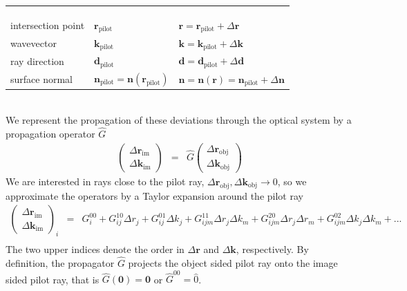 \documentclass[12pt,a4paper,twoside,openright,BCOR10mm,headsepline,titlepage,abstracton,chapterprefix,final]{scrreprt}
\newcommand\Vector[1]{{\mathbf{#1}}}
\newcommand\wavenumber{k}
\newcommand\Wavevector{\Vector{\wavenumber}}
\newcommand\pilot{\textrm{pilot}}
\newcommand\im{\textrm{im}}
\newcommand\obj{\textrm{obj}}
\begin{document}
\begin{tabular}{ l | l | l }
		    & \text{pilot ray} & \text{near-pilot ray} \\
& & \\ \hline & & \\
intersection point  & $\Vector{r}_{\pilot}$ & ${\Vector{r}} = \Vector{r}_{\pilot} + \Delta\Vector{r}$ \\
wavevector  & $\Wavevector_{\pilot}$ & ${\Wavevector} = \Wavevector_{\pilot} + \Delta\Wavevector$ \\
ray direction  & $\Vector{d}_{\pilot}$ & ${\Vector{d}} = \Vector{d}_{\pilot} + \Delta\Vector{d}$ \\
surface normal      & $\Vector{n}_{\pilot} = \Vector{n}(\Vector{r}_{\pilot})$ & ${\Vector{n}} = \Vector{n}({\Vector{r}}) = \Vector{n}_{\pilot} + \Delta\Vector{n}$ \\
\end{tabular}\\[2ex]
We represent the propagation of these deviations through the optical system by a propagation operator $\hat{G}$
\begin{eqnarray}
 \begin{pmatrix}
  \Delta \Vector{r}_\im \\ \Delta \Wavevector_\im
 \end{pmatrix}
 &=&
 \hat{G}
 \begin{pmatrix}
  \Delta \Vector{r}_\obj \\ \Delta \Wavevector_\obj
 \end{pmatrix}
\end{eqnarray}
We are interested in rays close to the pilot ray, $\Delta \Vector{r}_\obj, \Delta \Wavevector_\obj \rightarrow 0$,
so we approximate the operators by a Taylor expansion around the pilot ray
\begin{eqnarray}
 \begin{pmatrix}
  \Delta \Vector{r}_\im \\ \Delta \Wavevector_\im
 \end{pmatrix}_i
 &=&
   G^{00}_i
 + G^{10}_{ij} \Delta r_j
 + G^{01}_{ij} \Delta k_j
 + G^{11}_{ijm} \Delta r_j \Delta k_m
 + G^{20}_{ijm} \Delta r_j \Delta r_m
 + G^{02}_{ijm} \Delta k_j \Delta k_m
 + ...\nonumber\\
\end{eqnarray}
The two upper indices denote the order in $\Delta \Vector{r}$ and $\Delta \Vector{k}$, respectively.
By definition, the propagator $\hat{G}$ projects the object sided pilot ray onto the image sided pilot ray,
that is $\hat{G}(\Vector{0}) = \Vector{0}$ or $\hat{G}^{00} = \hat{0}$. 
\end{document}

